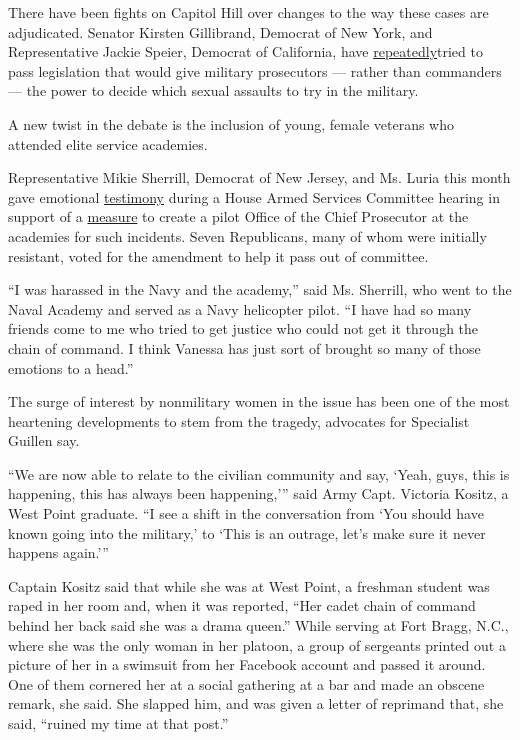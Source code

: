 There have been fights on Capitol Hill over changes to the way these
cases are adjudicated. Senator Kirsten Gillibrand, Democrat of New York,
and Representative Jackie Speier, Democrat of California, have
\href{https://www.nytimes.com/2013/06/15/us/politics/in-senate-complex-fight-over-curbing-sexual-military-assaults.html}{repeatedly}tried
to pass legislation that would give military prosecutors --- rather than
commanders --- the power to decide which sexual assaults to try in the
military.

A new twist in the debate is the inclusion of young, female veterans who
attended elite service academies.

Representative Mikie Sherrill, Democrat of New Jersey, and Ms. Luria
this month gave emotional
\href{https://www.dropbox.com/s/6rrnsoupppg981b/NDAA-pt2.mp4?dl=0}{testimony}
during a House Armed Services Committee hearing in support of a
\href{https://docs.house.gov/meetings/AS/AS00/20200701/110784/BILLS-116-HR6395-S001175-Amdt-227r1.pdf}{measure}
to create a pilot Office of the Chief Prosecutor at the academies for
such incidents. Seven Republicans, many of whom were initially
resistant, voted for the amendment to help it pass out of committee.

``I was harassed in the Navy and the academy,'' said Ms. Sherrill, who
went to the Naval Academy and served as a Navy helicopter pilot. ``I
have had so many friends come to me who tried to get justice who could
not get it through the chain of command. I think Vanessa has just sort
of brought so many of those emotions to a head.''

The surge of interest by nonmilitary women in the issue has been one of
the most heartening developments to stem from the tragedy, advocates for
Specialist Guillen say.

``We are now able to relate to the civilian community and say, `Yeah,
guys, this is happening, this has always been happening,''' said Army
Capt. Victoria Kositz, a West Point graduate. ``I see a shift in the
conversation from `You should have known going into the military,' to
`This is an outrage, let's make sure it never happens again.'''

Captain Kositz said that while she was at West Point, a freshman student
was raped in her room and, when it was reported, ``Her cadet chain of
command behind her back said she was a drama queen.'' While serving at
Fort Bragg, N.C., where she was the only woman in her platoon, a group
of sergeants printed out a picture of her in a swimsuit from her
Facebook account and passed it around. One of them cornered her at a
social gathering at a bar and made an obscene remark, she said. She
slapped him, and was given a letter of reprimand that, she said,
``ruined my time at that post.''

